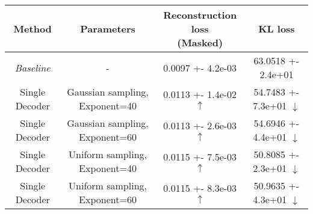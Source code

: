 \centering
\scriptsize
\begin{tabular}{||c|c|c|c||}
\hline
 Method & Parameters & \shortstack{Reconstruction loss \\  (Masked)} & KL loss \\
\hline
\textit{Baseline} & - & 0.0097 +- 4.2e-03 & 63.0518 +- 2.4e+01 \\
\hline
Single Decoder & Gaussian sampling, Exponent=40 & 0.0113 +- 1.4e-02  $\uparrow$ & 54.7483 +- 7.3e+01  $\downarrow$ \\
\hline
Single Decoder & Gaussian sampling, Exponent=60 & 0.0113 +- 2.6e-03  $\uparrow$ & 54.6946 +- 4.4e+01  $\downarrow$ \\
\hline
Single Decoder & Uniform sampling, Exponent=40 & 0.0115 +- 7.5e-03  $\uparrow$ & 50.8085 +- 2.3e+01  $\downarrow$ \\
\hline
Single Decoder & Uniform sampling, Exponent=60 & 0.0115 +- 8.3e-03  $\uparrow$ & 50.9635 +- 4.3e+01  $\downarrow$ \\
\hline
\end{tabular}

